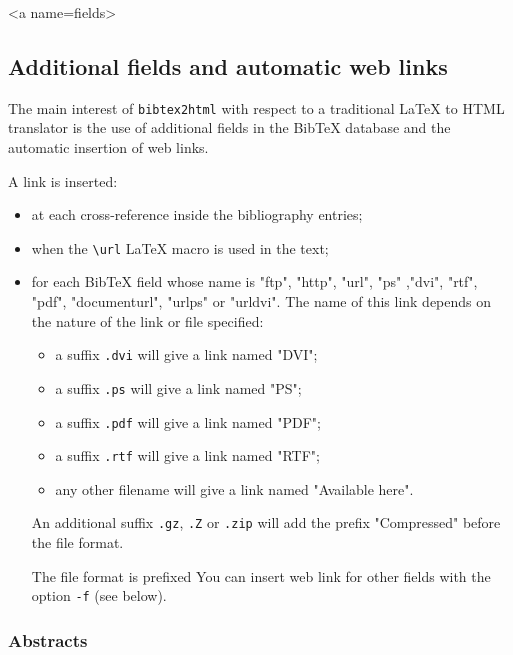 \documentclass[11pt,a4paper]{article}
\begin{document}
\begin{rawhtml}
<a name=fields>
\end{rawhtml}

\subsection{Additional fields and automatic web links}

The main interest of \texttt{bibtex2html} with respect to a
traditional LaTeX to HTML translator is the use of additional fields
in the BibTeX database and the automatic insertion of web
links.

A link is inserted:
\begin{itemize}

\item  at each cross-reference inside the bibliography entries; 

\item  when the \verb|\url| LaTeX macro is used in the text; 

\item  for each BibTeX field whose name is "ftp", "http", "url", "ps"
  ,"dvi", "rtf", "pdf",
  "documenturl", "urlps" or "urldvi". The name of this link depends on
  the nature of the link or file specified: 
  \begin{itemize}
  \item a suffix \texttt{.dvi} will give a link named "DVI";
  \item a suffix \texttt{.ps} will give a link named "PS";
  \item a suffix \texttt{.pdf} will give a link named "PDF";
  \item a suffix \texttt{.rtf} will give a link named "RTF";
  \item any other filename will give a link named "Available here".
  \end{itemize}
  
  An additional suffix \texttt{.gz}, \texttt{.Z} or
  \texttt{.zip} will add the prefix "Compressed" before the
  file format.

  The file format is prefixed 
  You can insert web link for other fields with the option
  \texttt{-f} (see below).
  
\end{itemize}



\subsubsection{Abstracts}
\end{document}
